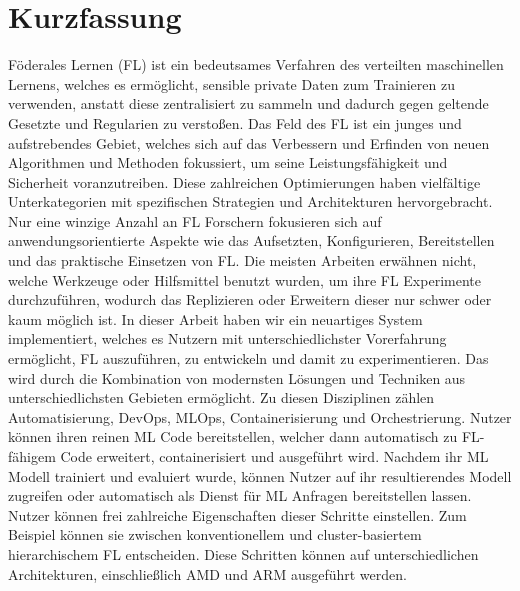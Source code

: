 \chapter{Kurzfassung}

Föderales Lernen (FL) ist ein bedeutsames Verfahren des verteilten maschinellen Lernens, welches es ermöglicht, sensible private Daten zum Trainieren zu verwenden, anstatt diese zentralisiert zu sammeln und dadurch gegen geltende Gesetzte und Regularien zu verstoßen.
Das Feld des FL ist ein junges und aufstrebendes Gebiet, welches sich auf das Verbessern und Erfinden von neuen Algorithmen und Methoden fokussiert, um seine Leistungsfähigkeit und Sicherheit voranzutreiben.
Diese zahlreichen Optimierungen haben vielfältige Unterkategorien mit spezifischen Strategien und Architekturen hervorgebracht.
Nur eine winzige Anzahl an FL Forschern fokusieren sich auf anwendungsorientierte Aspekte wie das Aufsetzten, Konfigurieren, Bereitstellen und das praktische Einsetzen von FL.
Die meisten Arbeiten erwähnen nicht, welche Werkzeuge oder Hilfsmittel benutzt wurden, um ihre FL Experimente durchzuführen, wodurch das Replizieren oder Erweitern dieser nur schwer oder kaum möglich ist.
In dieser Arbeit haben wir ein neuartiges System implementiert, welches es Nutzern mit unterschiedlichster Vorerfahrung ermöglicht, FL auszuführen, zu entwickeln und damit zu experimentieren.
Das wird durch die Kombination von modernsten Lösungen und Techniken aus unterschiedlichsten Gebieten ermöglicht.
Zu diesen Disziplinen zählen Automatisierung, DevOps, MLOps, Containerisierung und Orchestrierung.
Nutzer können ihren reinen ML Code bereitstellen, welcher dann automatisch zu FL-fähigem Code erweitert, containerisiert und ausgeführt wird.
Nachdem ihr ML Modell trainiert und evaluiert wurde, können Nutzer auf ihr resultierendes Modell zugreifen oder automatisch als Dienst für ML Anfragen bereitstellen lassen.
Nutzer können frei zahlreiche Eigenschaften dieser Schritte einstellen.
Zum Beispiel können sie zwischen konventionellem und cluster-basiertem hierarchischem FL entscheiden.
Diese Schritten können auf unterschiedlichen Architekturen, einschließlich AMD und ARM ausgeführt werden.
